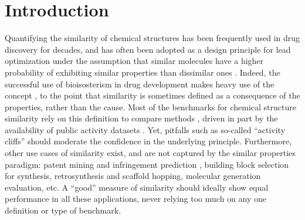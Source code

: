 \documentclass[doublespacing]{bmcart}
\begin{document}
\section*{Introduction}
Quantifying the similarity of chemical structures has been frequently used in drug discovery for decades\cite{willett1998chemical}, and has often been adopted as a design principle for lead optimization \cite{kubinyi1998similarity, maggiora2014molecular} under the assumption that similar molecules have a higher probability of exhibiting similar properties than dissimilar ones \cite{johnson1990concepts, patterson1996neighborhood, martin2002structurally}. Indeed, the successful use of bioisosterism in drug development makes heavy use of the concept  \cite{patani1996bioisosterism, lima2005bioisosterism}, to the point that similarity is sometimes defined as a consequence of the properties, rather than the cause\cite{bender2004molecular}. Most of the benchmarks for chemical structure similarity rely on this definition to compare methods \cite{irwin2008community, rohrer2009maximum, riniker2013open}, driven in part by the availability of public activity datasets \cite{gaulton2012chembl}. Yet, pitfalls such as so-called ``activity cliffs''\cite{maggiora2006outliers, stumpfe2012exploring, stumpfe2014recent} should moderate the confidence in the underlying principle. Furthermore, other use cases of similarity exist, and are not captured by the similar properties paradigm: patent mining and infringement prediction \cite{rhodes2007mining}, building block selection for synthesis, retrosynthesis and scaffold hopping\cite{bohm2004scaffold, boehm2008similarity, coley2017computer}, molecular generation evaluation\cite{mendez2020novo}, etc. A ``good'' measure of similarity should ideally show equal performance in all these applications, never relying too much on any one definition or type of benchmark.
\end{document}
